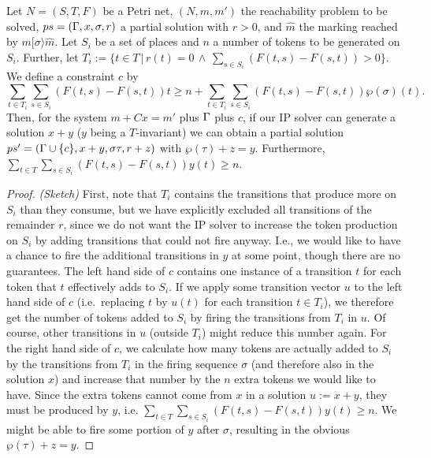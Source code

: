 \documentclass{LMCS}
\newcommand{\step}[1]{[#1\rangle}
\newcommand{\parikh}{\wp}
\newcommand{\I}{C} \newcommand{\C}{{\ensuremath \Gamma}} \newcommand{\ord}{\ensuremath{\Omega}}
\begin{document}
\begin{lem}\label{L.CON}
Let $N=(S,T,F)$ be a Petri net, $(N,m,m')$ the reachability problem to be solved, $ps=(\C,x,\sigma,r)$ a partial solution
with $r>0$, and $\hat{m}$ the marking reached by $m\step{\sigma}\hat{m}$.
Let $S_i$ be a set of places and $n$ a number of tokens to be generated on $S_i$.
Further, let $T_i:=\{t\in T\,|\,r(t)=0\,\wedge\,\sum_{s\in S_i}(F(t,s)-F(s,t))>0\}$.
We define a constraint $c$ by
\[ \sum_{t\in T_i} \sum_{s\in S_i} (F(t,s)-F(s,t))t \ge n+\sum_{t\in T_i}\sum_{s\in S_i}(F(t,s)-F(s,t))\parikh(\sigma)(t).\]
Then, for the system $m+\I x=m'$ plus $\C$ plus $c$, if our IP solver can generate a solution $x+y$ ($y$ being a $T$-invariant) 
we can obtain a partial solution $ps'=(\C\cup\{c\},x+y,\sigma\tau,r+z)$ with $\parikh(\tau)+z=y$. Furthermore,
$\sum_{t\in T}\sum_{s\in S_i}(F(t,s)-F(s,t))y(t)\ge n$.
\end{lem}
\begin{proof} {\em (Sketch)}
First, note that $T_i$ contains the transitions that produce more on $S_i$ than they consume, but we have explicitly excluded
all transitions of the remainder $r$, since we do not want the IP solver to increase the token production on $S_i$ by adding
transitions that could not fire anyway. I.e., we would like to have a chance to fire the additional transitions in $y$ at
some point, though there are no guarantees. The left hand side of $c$ contains one instance of a transition $t$ for each
token that $t$ effectively adds to $S_i$. If we apply some transition vector $u$ to the left hand side of $c$ (i.e.\ 
replacing $t$ by $u(t)$ for each transition $t\in T_i$), we therefore
get the number of tokens added to $S_i$ by firing the transitions from $T_i$ in $u$. Of course, other transitions in $u$ (outside $T_i$) might
reduce this number again. For the right hand side of $c$, we calculate how many tokens are actually added to $S_i$ by the
transitions from $T_i$ in the firing sequence $\sigma$ (and therefore also in the solution $x$) and increase that number by 
the $n$ extra tokens we would like to have. Since the extra tokens cannot come from $x$ in a solution $u:=x+y$, they must
be produced by $y$, i.e. $\sum_{t\in T}\sum_{s\in S_i}(F(t,s)-F(s,t))y(t)\ge n$. We might be able to fire some portion of $y$
after $\sigma$, resulting in the obvious $\parikh(\tau)+z=y$.
\end{proof}
\end{document}
